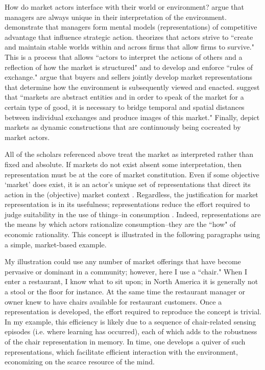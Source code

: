 How do market actors interface with their world or environment? \citet{daft1984} argue that managers are always unique in their interpretation of the environment. \citet{day1994} demonstrate that managers form mental models (representations) of competitive advantage that influence strategic action. \citet{fligstein1996} theorizes that actors strive to ``create and maintain stable worlds within and across firms that allow firms to survive." This is a process that allows ``actors to interpret the actions of others and a reflection of how the market is structured" and to develop and enforce ``rules of exchange."  \citet{rosa1999} argue that buyers and sellers jointly develop market representations that determine how the environment is subsequently viewed and enacted. \citet[p. 143]{kjellberg2007} suggest that ``markets are abstract entities and in order to speak of the market for a certain type of good, it is necessary to bridge temporal and spatial distances between individual exchanges and produce images of this market." Finally, \citet{lusch2014} depict markets as dynamic constructions that are continuously being cocreated by market actors. 

All of the scholars referenced above treat the market as interpreted rather than fixed and absolute. If markets do not exist absent some interpretation, then representation must be at the core of market constitution. Even if some objective `market' does exist, it is an actor's unique set of representations that direct its action in the (objective) market context \citep{north1990, loasby1999}. Regardless, the justification for market representation is in its usefulness; representations reduce the effort required to judge suitability in the use of things--in consumption \citep{whitehead1911}. Indeed, representations are the means by which actors rationalize consumption--they are the ``how" of economic rationality. This concept is illustrated in the following paragraphs using a simple, market-based example. 

My illustration could use any number of market offerings that have become pervasive or dominant in a community; however, here I use a ``chair." When I enter a restaurant, I know what to sit upon; in North America it is generally not a stool or the floor for instance. At the same time the restaurant manager or owner knew to have chairs available for restaurant customers. Once a representation is developed, the effort required to reproduce the concept is trivial. In my example, this efficiency is likely due to a sequence of chair-related sensing episodes (i.e. where learning has occurred), each of which adds to the robustness of the chair representation in memory. In time, one develops a quiver of such representations, which facilitate efficient interaction with the environment, economizing on the scarce resource of the mind. 

